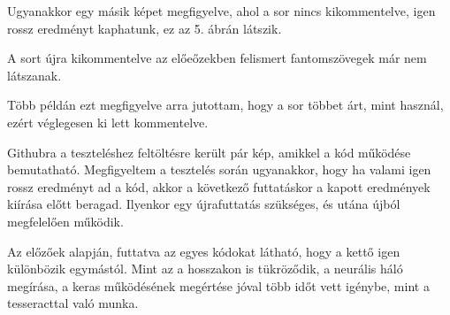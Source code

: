 \documentclass[hidelinks,12pt,a4paper]{report}
\begin{document}
Ugyanakkor egy másik képet megfigyelve, ahol a sor nincs kikommentelve, igen rossz eredményt kaphatunk, ez az 5. ábrán látszik.


A sort újra kikommentelve az előeőzekben felismert fantomszövegek már nem látszanak. 


Több példán ezt megfigyelve arra jutottam, hogy a sor többet árt, mint használ, ezért véglegesen ki lett kommentelve.

Githubra a teszteléshez feltöltésre került pár kép, amikkel a kód működése bemutatható. Megfigyeltem a tesztelés során ugyanakkor, hogy ha valami igen rossz eredményt ad a kód, akkor a következő futtatáskor a kapott eredmények kiírása előtt beragad. Ilyenkor egy újrafuttatás szükséges, és utána újból megfelelően működik.


Az előzőek alapján, futtatva az egyes kódokat látható, hogy a kettő igen különbözik egymástól. Mint az a hosszakon is tükröződik, a neurális háló megírása, a keras működésének megértése jóval több időt vett igénybe, mint a tesseracttal való munka.


	

	
\end{document}
